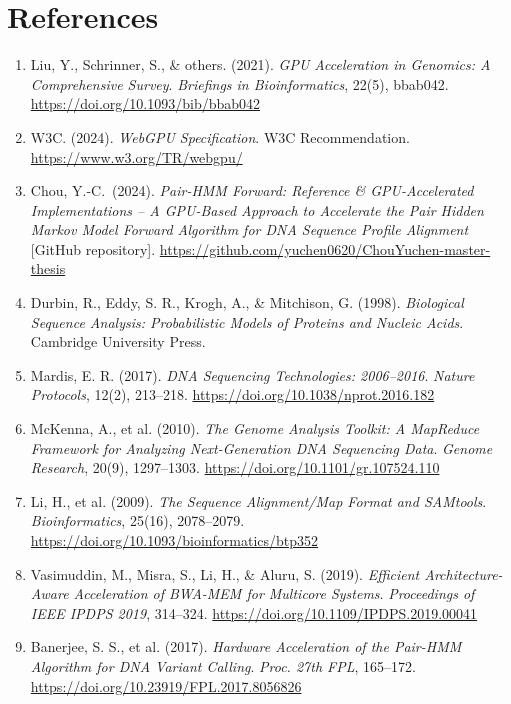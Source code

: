 \documentclass[PhD]{PHlab-thesis}
\begin{document}
\chapter{References}
\begin{enumerate}
  \item Liu, Y., Schrinner, S., \& others. (2021). \emph{GPU Acceleration in Genomics: A Comprehensive Survey}. \textit{Briefings in Bioinformatics}, 22(5), bbab042. \url{https://doi.org/10.1093/bib/bbab042}

  \item W3C. (2024). \emph{WebGPU Specification}. W3C Recommendation. \url{https://www.w3.org/TR/webgpu/}

    \item Chou, Y.-C.\ (2024). \emph{Pair-HMM Forward: Reference \& GPU-Accelerated Implementations – A GPU-Based Approach to Accelerate the Pair Hidden Markov Model Forward Algorithm for DNA Sequence Profile Alignment} [GitHub repository]. \url{https://github.com/yuchen0620/ChouYuchen-master-thesis}



  \item Durbin, R., Eddy, S. R., Krogh, A., \& Mitchison, G. (1998). \emph{Biological Sequence Analysis: Probabilistic Models of Proteins and Nucleic Acids}. Cambridge University Press.

  \item Mardis, E. R. (2017). \emph{DNA Sequencing Technologies: 2006–2016}. \textit{Nature Protocols}, 12(2), 213–218. \url{https://doi.org/10.1038/nprot.2016.182}

  \item McKenna, A., et al. (2010). \emph{The Genome Analysis Toolkit: A MapReduce Framework for Analyzing Next-Generation DNA Sequencing Data}. \textit{Genome Research}, 20(9), 1297–1303. \url{https://doi.org/10.1101/gr.107524.110}

  \item Li, H., et al. (2009). \emph{The Sequence Alignment/Map Format and SAMtools}. \textit{Bioinformatics}, 25(16), 2078–2079. \url{https://doi.org/10.1093/bioinformatics/btp352}

  \item Vasimuddin, M., Misra, S., Li, H., \& Aluru, S. (2019). \emph{Efficient Architecture-Aware Acceleration of BWA-MEM for Multicore Systems}. \textit{Proceedings of IEEE IPDPS 2019}, 314–324. \url{https://doi.org/10.1109/IPDPS.2019.00041}

  \item Banerjee, S. S., et al. (2017). \emph{Hardware Acceleration of the Pair-HMM Algorithm for DNA Variant Calling}. \textit{Proc. 27th FPL}, 165–172. \url{https://doi.org/10.23919/FPL.2017.8056826}


\end{enumerate}
\end{document}
